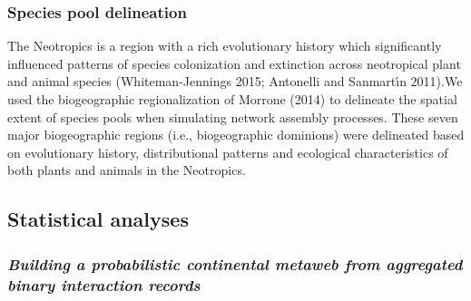 \documentclass[
]{agujournal2019}
\begin{document}
\subsubsection{Species pool delineation}\label{species-pool-delineation}

The Neotropics is a region with a rich evolutionary history which
significantly influenced patterns of species colonization and extinction
across neotropical plant and animal species (Whiteman-Jennings 2015;
Antonelli and Sanmartı́n 2011).We used the biogeographic regionalization
of Morrone (2014) to delineate the spatial extent of species pools when
simulating network assembly processes. These seven major biogeographic
regions (i.e., biogeographic dominions) were delineated based on
evolutionary history, distributional patterns and ecological
characteristics of both plants and animals in the Neotropics. ~

\subsection{\texorpdfstring{\textbf{Statistical
analyses}}{Statistical analyses}}\label{statistical-analyses}

\subsubsection{\texorpdfstring{\emph{Building a probabilistic
continental metaweb from aggregated binary interaction
records}}{Building a probabilistic continental metaweb from aggregated binary interaction records}}\label{building-a-probabilistic-continental-metaweb-from-aggregated-binary-interaction-records}
\end{document}
